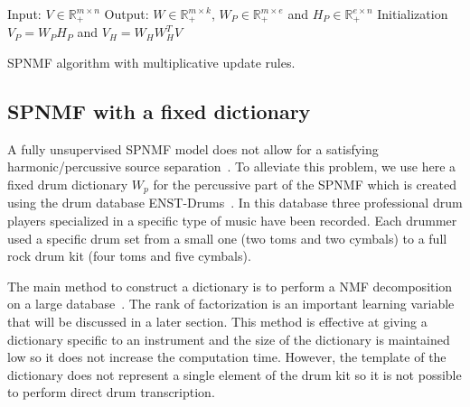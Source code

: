 \begin{algorithm}[h]
 Input: $V \in \mathbb{R}_{+}^{m \times n} $
 Output: $W \in \mathbb{R}_{+}^{m \times k}$, $W_P \in \mathbb{R}_+^{m \times e}$ and $H_P \in \mathbb{R}_{+}^{e \times n}$
 Initialization\;
 $ V_P = W_PH_P $ and
 $ V_H = W_HW_H^TV $ 
  
 \vspace{0.2cm}
 \caption{SPNMF algorithm with multiplicative update rules.}\label{AlgoMultipl}
\end{algorithm}


\subsection{SPNMF with a fixed dictionary}\label{fixedict}  

A fully unsupervised SPNMF model does not allow for a satisfying harmonic/percussive source separation~\cite{laroche2015structured}. To alleviate this problem, we use here a fixed drum dictionary $W_p$ for the percussive part of the SPNMF which is created using the drum database ENST-Drums~\cite{gillet2006enst}. In this database three professional drum players specialized in a specific type of music have been recorded. Each drummer used a specific drum set from a small one (two toms and two cymbals) to a full rock drum kit (four toms and five cymbals). 

The main method to construct a dictionary is to perform a NMF decomposition on a large database~\cite{jaureguiberry2011adaptation}. The rank of factorization is an important learning variable that will be discussed in a later section. This method is effective at giving a dictionary specific to an instrument and the size of the dictionary is maintained low so it does not increase the computation time. However, the template of the dictionary does not represent a single element of the drum kit so it is not possible to perform direct drum transcription.

